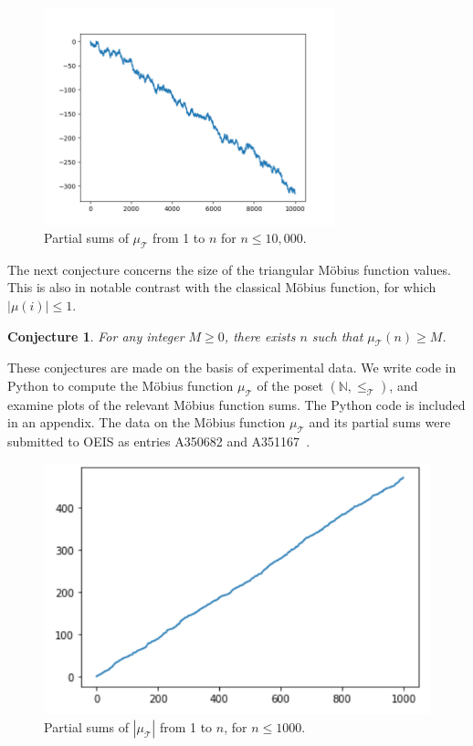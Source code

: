 \documentclass{amsart}
\newtheorem{conj}[thm]{Conjecture}
\theoremstyle{definition}
\newcommand{\NN}{\mathbb{N}}
\newcommand{\Mobius}{M\"obius}
\newcommand{\leqtri}{\leq_{\tri}}
\newcommand{\mutri}{\mu_{\tri}}
\newcommand{\tri}{\mathcal T}
\begin{document}
\begin{figure}[h]
    \centering
    \includegraphics[width = 0.75\textwidth]{10000_Sum_Function}
    \caption{Partial sums of $\mutri$ from 1 to $n$ for $n \leq 10,000$.}
    \label{fig:mutri-partial-sums}
\end{figure}

The next conjecture concerns the size of the triangular \Mobius{} function values.
This is also in notable contrast with the classical \Mobius{} function, for which $|\mu(i)| \leq 1$.
\begin{conj}
    For any integer $M \geq 0$, there exists $n$ such that $\mutri(n) \geq M$.
\end{conj}

These conjectures are made on the basis of experimental data. We write code in Python to compute the \Mobius{} function $\mutri$ of the poset $(\NN, \leqtri)$, and examine plots of the relevant \Mobius{} function sums. 
The Python code is included in an appendix.
The data on the \Mobius{} function $\mutri$ and its partial sums were submitted to OEIS as entries A350682 and A351167~\cites{OEIS-mobius, OEIS-mobius-sums}.

\begin{figure}[h] %
    \centering
    \includegraphics{1000_Sum_Abs_Value.PNG}
    \caption{Partial sums of $|\mutri |$ from 1 to $n$, for $n \leq 1000$.}
    \label{fig:mutri-abs-partial-sums}
\end{figure}
\end{document}
